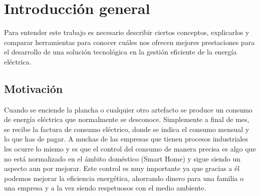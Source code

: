 
\chapter{Introducción general} %

\label{Chapter1} %
\label{IntroGeneral}
Para entender este trabajo es necesario describir ciertos conceptos, explicarlos y comparar herramientas para conocer cuáles nos ofrecen mejores prestaciones para el desarrollo de una solución tecnológica en la gestión eficiente de la energía eléctrica. 

\newcommand{\keyword}[1]{\textbf{#1}}
\newcommand{\tabhead}[1]{\textbf{#1}}
\newcommand{\code}[1]{\texttt{#1}}
\newcommand{\file}[1]{\texttt{\bfseries#1}}
\newcommand{\option}[1]{\texttt{\itshape#1}}
\newcommand{\grados}{$^{\circ}$}



\section{Motivación}

Cuando se enciende la plancha o cualquier otro artefacto se produce un consumo de energía eléctrica que normalmente se desconoce. Simplemente a final de mes, se recibe la factura de consumo eléctrico, donde se indica el consumo mensual y lo que has de pagar. A muchas de las empresas que tienen procesos industriales les ocurre lo mismo y es que el control del consumo de manera precisa es algo que no está normalizado en el ámbito doméstico (Smart Home) y sigue siendo un aspecto aun por mejorar. Este control es muy importante ya que gracias a él podemos mejorar la eficiencia energética, ahorrando dinero para una familia o una empresa y a la vez siendo respetuosos con el medio ambiente.

